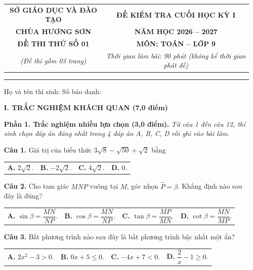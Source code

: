 \documentclass[11pt,a4paper]{article}
\begin{document}
\noindent
\begin{tabular*}{\linewidth}{@{\extracolsep{\fill}}cc@{}}
\textbf{SỞ GIÁO DỤC VÀ ĐÀO TẠO} & \textbf{ĐỀ KIỂM TRA CUỐI HỌC KỲ I} \\
\textbf{CHÙA HƯƠNG SƠN} & \textbf{NĂM HỌC 2026 -- 2027} \\
\textbf{ĐỀ THI THỬ SỐ 01} & \textbf{MÔN: TOÁN -- LỚP 9} \\
\textit{(Đề thi gồm 03 trang)} & \textit{Thời gian làm bài: 90 phút (không kể thời gian phát đề)} \\
\end{tabular*}

\vspace{2mm}
\noindent
\rule{\linewidth}{0.8pt}

\vspace{1mm}
\noindent
Họ và tên thí sinh: \dotfill Số báo danh: \dotfill

\vspace{2mm}
\noindent
\textbf{\large I. TRẮC NGHIỆM KHÁCH QUAN (7,0 điểm)}

\vspace{1mm}
\noindent
\textbf{Phần 1. Trắc nghiệm nhiều lựa chọn (3,0 điểm).} \textit{Từ câu 1 đến câu 12, thí sinh chọn đáp án đúng nhất trong 4 đáp án A, B, C, D rồi ghi vào bài làm.}

\vspace{1.5mm}
\textbf{Câu 1.} Giá trị của biểu thức $3\sqrt{8} - \sqrt{50} + \sqrt{2}$ bằng\\
\begin{tabularx}{\linewidth}{XXXX}
\textbf{A.} $2\sqrt{2}$. & \textbf{B.} $-2\sqrt{2}$. & \textbf{C.} $4\sqrt{2}$. & \textbf{D.} $0$.
\end{tabularx}

\vspace{1.5mm}
\textbf{Câu 2.} Cho tam giác $MNP$ vuông tại $M$, góc nhọn $\widehat{P} = \beta$. Khẳng định nào sau đây là đúng?\\
\begin{tabularx}{\linewidth}{XXXX}
\textbf{A.} $\sin \beta = \dfrac{MN}{NP}$. & \textbf{B.} $\cos \beta = \dfrac{MN}{NP}$. & \textbf{C.} $\tan \beta = \dfrac{MP}{MN}$. & \textbf{D.} $\cot \beta = \dfrac{MN}{MP}$.
\end{tabularx}

\vspace{1.5mm}
\textbf{Câu 3.} Bất phương trình nào sau đây là bất phương trình bậc nhất một ẩn?\\
\begin{tabularx}{\linewidth}{XXXX}
\textbf{A.} $2x^2 - 3 > 0$. & \textbf{B.} $0x + 5 \le 0$. & \textbf{C.} $-4x + 7 < 0$. & \textbf{D.} $\dfrac{2}{x} - 1 \ge 0$.
\end{tabularx}
\end{document}
